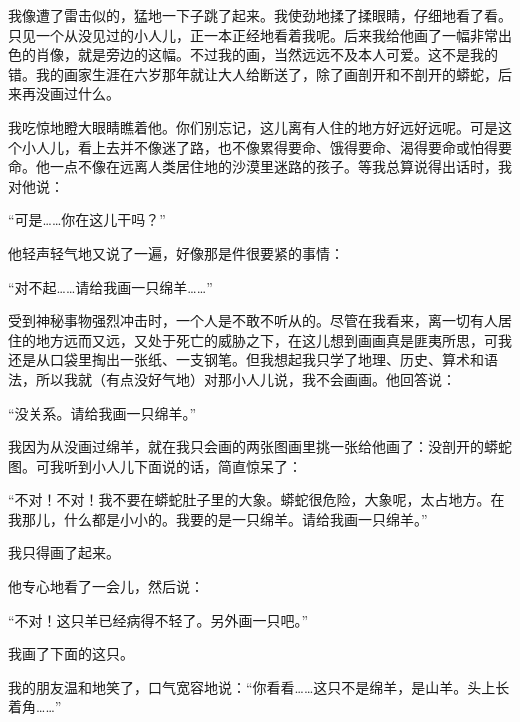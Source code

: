 我像遭了雷击似的，猛地一下子跳了起来。我使劲地揉了揉眼睛，仔细地看了看。只见一个从没见过的小人儿，正一本正经地看着我呢。后来我给他画了一幅非常出色的肖像，就是旁边的这幅。不过我的画，当然远远不及本人可爱。这不是我的错。我的画家生涯在六岁那年就让大人给断送了，除了画剖开和不剖开的蟒蛇，后来再没画过什么。

我吃惊地瞪大眼睛瞧着他。你们别忘记，这儿离有人住的地方好远好远呢。可是这个小人儿，看上去并不像迷了路，也不像累得要命、饿得要命、渴得要命或怕得要命。他一点不像在远离人类居住地的沙漠里迷路的孩子。等我总算说得出话时，我对他说：

“可是\ldots{}\ldots{}你在这儿干吗？”

他轻声轻气地又说了一遍，好像那是件很要紧的事情：

“对不起\ldots{}\ldots{}请给我画一只绵羊\ldots{}\ldots{}”

受到神秘事物强烈冲击时，一个人是不敢不听从的。尽管在我看来，离一切有人居住的地方远而又远，又处于死亡的威胁之下，在这儿想到画画真是匪夷所思，可我还是从口袋里掏出一张纸、一支钢笔。但我想起我只学了地理、历史、算术和语法，所以我就（有点没好气地）对那小人儿说，我不会画画。他回答说：

“没关系。请给我画一只绵羊。”

我因为从没画过绵羊，就在我只会画的两张图画里挑一张给他画了：没剖开的蟒蛇图。可我听到小人儿下面说的话，简直惊呆了：

“不对！不对！我不要在蟒蛇肚子里的大象。蟒蛇很危险，大象呢，太占地方。在我那儿，什么都是小小的。我要的是一只绵羊。请给我画一只绵羊。”

{\startalignment[center]
 \stopalignment}

我只得画了起来。

他专心地看了一会儿，然后说：

“不对！这只羊已经病得不轻了。另外画一只吧。”

我画了下面的这只。

我的朋友温和地笑了，口气宽容地说：“你看看\ldots{}\ldots{}这只不是绵羊，是山羊。头上长着角\ldots{}\ldots{}”

{\startalignment[center]
 \stopalignment}

{\startalignment[center]
 \stopalignment}

